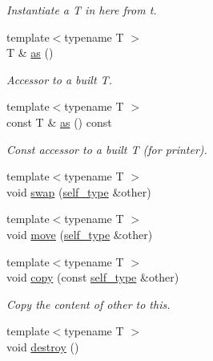 \begin{DoxyCompactItemize}
\begin{DoxyCompactList}\small\item\em Instantiate a {\itshape T} in here from {\itshape t}. \end{DoxyCompactList}\item 
\hypertarget{structyy_1_1variant_a7fae4866c8d57a6f2ea30e9926e367cd}{}{\footnotesize template$<$typename T $>$ }\\T \& \hyperlink{structyy_1_1variant_a7fae4866c8d57a6f2ea30e9926e367cd}{as} ()\label{structyy_1_1variant_a7fae4866c8d57a6f2ea30e9926e367cd}

\begin{DoxyCompactList}\small\item\em Accessor to a built {\itshape T}. \end{DoxyCompactList}\item 
\hypertarget{structyy_1_1variant_a7930977f8a1b707c687daec8b0d76e70}{}{\footnotesize template$<$typename T $>$ }\\const T \& \hyperlink{structyy_1_1variant_a7930977f8a1b707c687daec8b0d76e70}{as} () const \label{structyy_1_1variant_a7930977f8a1b707c687daec8b0d76e70}

\begin{DoxyCompactList}\small\item\em Const accessor to a built {\itshape T} (for printer). \end{DoxyCompactList}\item 
{\footnotesize template$<$typename T $>$ }\\void \hyperlink{structyy_1_1variant_ac43b5ffdcedbda5462c53832027707ac}{swap} (\hyperlink{structyy_1_1variant_afbd75aee339bd9fa06e6fa8f320cecd3}{self\+\_\+type} \&other)
\item 
{\footnotesize template$<$typename T $>$ }\\void \hyperlink{structyy_1_1variant_ae71b4ef21f1446b328b9d93dbc6806e1}{move} (\hyperlink{structyy_1_1variant_afbd75aee339bd9fa06e6fa8f320cecd3}{self\+\_\+type} \&other)
\item 
\hypertarget{structyy_1_1variant_a526d966e2923f6ae1d3fab2e1eac5311}{}{\footnotesize template$<$typename T $>$ }\\void \hyperlink{structyy_1_1variant_a526d966e2923f6ae1d3fab2e1eac5311}{copy} (const \hyperlink{structyy_1_1variant_afbd75aee339bd9fa06e6fa8f320cecd3}{self\+\_\+type} \&other)\label{structyy_1_1variant_a526d966e2923f6ae1d3fab2e1eac5311}

\begin{DoxyCompactList}\small\item\em Copy the content of {\itshape other} to this. \end{DoxyCompactList}\item 
\hypertarget{structyy_1_1variant_a20a07d58bf12eda819ad013c5d9853cb}{}{\footnotesize template$<$typename T $>$ }\\void \hyperlink{structyy_1_1variant_a20a07d58bf12eda819ad013c5d9853cb}{destroy} ()\label{structyy_1_1variant_a20a07d58bf12eda819ad013c5d9853cb}


\end{DoxyCompactItemize}
